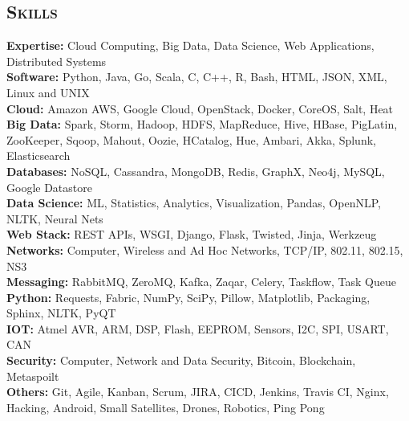 \begin{resume}


\section{\textsc{Skills}}
{\bf Expertise:} Cloud Computing, Big Data, Data Science, Web Applications, Distributed Systems
\\ {\bf Software:} Python, Java, Go, Scala, C, C++, R, Bash, HTML, JSON, XML, Linux and UNIX
\\ {\bf Cloud:} Amazon AWS, Google Cloud, OpenStack, Docker, CoreOS, Salt, Heat
\\ {\bf Big Data:} Spark, Storm, Hadoop, HDFS, MapReduce, Hive, HBase, PigLatin, ZooKeeper, Sqoop, Mahout, Oozie, HCatalog, Hue, Ambari, Akka, Splunk, Elasticsearch
\\ {\bf Databases:} NoSQL, Cassandra, MongoDB, Redis, GraphX, Neo4j, MySQL, Google Datastore
\\ {\bf Data Science:} ML, Statistics, Analytics, Visualization, Pandas, OpenNLP, NLTK, Neural Nets
\\ {\bf Web Stack:} REST APIs, WSGI, Django, Flask, Twisted, Jinja, Werkzeug 
\\ {\bf Networks:} Computer, Wireless and Ad Hoc Networks, TCP/IP, 802.11, 802.15, NS3
\\ {\bf Messaging:} RabbitMQ, ZeroMQ, Kafka, Zaqar, Celery, Taskflow, Task Queue
\\ {\bf Python:} Requests, Fabric, NumPy, SciPy, Pillow, Matplotlib, Packaging, Sphinx, NLTK, PyQT
\\ {\bf IOT:} Atmel AVR, ARM, DSP, Flash, EEPROM, Sensors, I2C, SPI, USART, CAN
\\ {\bf Security:} Computer, Network and Data Security, Bitcoin, Blockchain, Metaspoilt
\\ {\bf Others:} Git, Agile, Kanban, Scrum, JIRA, CICD, Jenkins, Travis CI, Nginx, Hacking, Android, Small Satellites, Drones, Robotics, Ping Pong


\end{resume}

